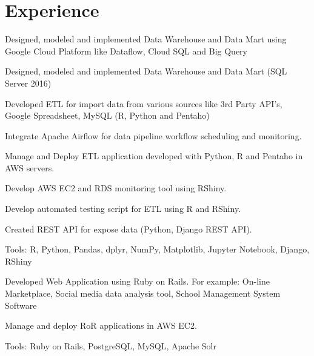 \documentclass[]{deedy-resume-openfont}
\begin{document}
\begin{minipage}[t]{0.66\textwidth} 


\section{Experience}

\vspace{\topsep} %
\begin{tightemize}
\item Designed, modeled and implemented Data Warehouse and Data Mart using Google Cloud Platform like Dataflow, Cloud SQL and Big Query 
\end{tightemize}
\sectionsep

\vspace{\topsep} %
\begin{tightemize}
\item Designed, modeled and implemented Data Warehouse and Data Mart (SQL Server 2016)
\item Developed ETL for import data from various sources like 3rd Party API's, Google Spreadsheet, MySQL (R, Python and Pentaho)
\item Integrate Apache Airflow for data pipeline workflow scheduling and monitoring.
\item Manage and Deploy ETL application developed with Python, R and Pentaho in AWS servers.
\item Develop AWS EC2 and RDS monitoring tool using RShiny.
\item Develop automated testing script for ETL using R and RShiny.
\item Created REST API for expose data (Python, Django REST API).
\item Tools: R, Python, Pandas, dplyr, NumPy, Matplotlib, Jupyter Notebook, Django, RShiny
\end{tightemize}
\sectionsep

\begin{tightemize}
\item Developed Web Application using Ruby on Rails. For example: On-line Marketplace, Social media data analysis tool, School Management System Software
\item Manage and deploy RoR applications in AWS EC2.
\item Tools: Ruby on Rails, PostgreSQL, MySQL, Apache Solr
\end{tightemize}
\sectionsep


\end{minipage}
\end{document}
